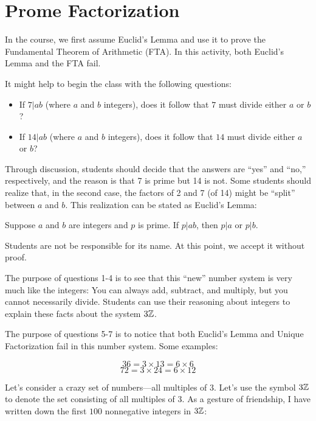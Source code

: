 \newpage
\section{Prome Factorization}\label{A:Prome}

\begin{teachingnote}
In the course, we first assume Euclid's Lemma and use it to prove the Fundamental Theorem of Arithmetic (FTA).  In this activity, both Euclid's Lemma and the FTA fail.

It might help to begin the class with the following questions:  
\begin{itemize}
\item If $7|ab$ (where $a$ and $b$ integers), does it follow that $7$ must divide either $a$ or $b$? 
\item If $14|ab$ (where $a$ and $b$ integers), does it follow that $14$ must divide either $a$ or $b$? 
\end{itemize}

Through discussion, students should decide that the answers are ``yes'' and ``no,'' respectively, and the reason is that 7 is prime but 14 is not.  Some students should realize that, in the second case, the factors of 2 and 7 (of 14) might be ``split'' between $a$ and $b$.  This realization can be stated as Euclid's Lemma:  

\begin{center}
Suppose $a$ and $b$ are integers and $p$ is prime.  If $p|ab$, then $p|a$ or $p|b$.  
\end{center}

Students are not be responsible for its name.  At this point, we accept it without proof.  

The purpose of questions 1-4 is to see that this ``new'' number system is very much like the integers:  You can always add, subtract, and multiply, but you cannot necessarily divide.  Students can use their reasoning about integers to explain these facts about the system $3\mathbb Z$.  

The purpose of questions 5-7 is to notice that both Euclid's Lemma and Unique Factorization fail in this number system.  Some examples:  

$$36 = 3\times 13 = 6\times 6$$
$$72 = 3\times 24=6\times 12$$
\end{teachingnote}


Let's consider a crazy set of numbers---all multiples of $3$. Let's
use the symbol $3\mathbb Z$ to denote the set consisting of all multiples of
$3$. As a gesture of friendship, I have written down the first $100$
nonnegative integers in $3\mathbb Z$:

